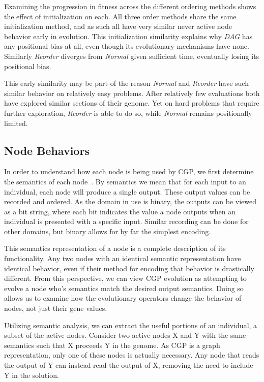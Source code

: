 \documentclass[journal]{IEEEtran}
\begin{document}
Examining the progression in fitness across the different ordering methods shows
the effect of initialization on each.  All three order methods share the same initialization
method, and as such all have very similar never active node behavior early in
evolution.  This initialization similarity explains why \emph{DAG} has any positional
bias at all, even though its evolutionary mechanisms have none.  Similarly \emph{Reorder}
diverges from \emph{Normal} given sufficient time, eventually losing its positional
bias.

This early similarity may be part of the reason \emph{Normal} and \emph{Reorder}
have such similar behavior on relatively easy problems.  After relatively few
evaluations both have explored similar sections of their genome.  Yet on hard
problems that require further exploration, \emph{Reorder} is able to do so, while
\emph{Normal} remains positionally limited.

\subsection{Node Behaviors}
\label{sec:behavior}

In order to understand how each node is being used by CGP,
we first determine the semantics of each node~\cite{mcphee:2008:treesemantics}.
By semantics we mean that for each input to an individual, each node
will produce a single output.  These output values can be recorded and ordered.
As the domain in use is binary, the outputs can be viewed as a bit string, where
each bit indicates the value a node outputs when an individual is presented with a
specific input.  Similar recording can be done for other domains, but binary
allows for by far the simplest encoding.

This semantics representation of a node is a complete description of its functionality.
Any two nodes with an identical semantic representation have identical behavior,
even if their method for encoding that behavior is drastically different.  From
this perspective, we can view CGP evolution as attempting to evolve a node who's
semantics match the desired output semantics.  Doing so allows
us to examine how the evolutionary operators change the behavior of nodes,
not just their gene values.

Utilizing semantic analysis, we can extract the useful
portions of an individual, a subset of the active nodes.  Consider two active
nodes X and Y with the same semantics such that X proceeds Y in the genome.
As CGP is a graph representation, only
one of these nodes is actually necessary.  Any node that reads the output of Y
can instead read the output of X, removing the need to include Y in the solution.
\end{document}
